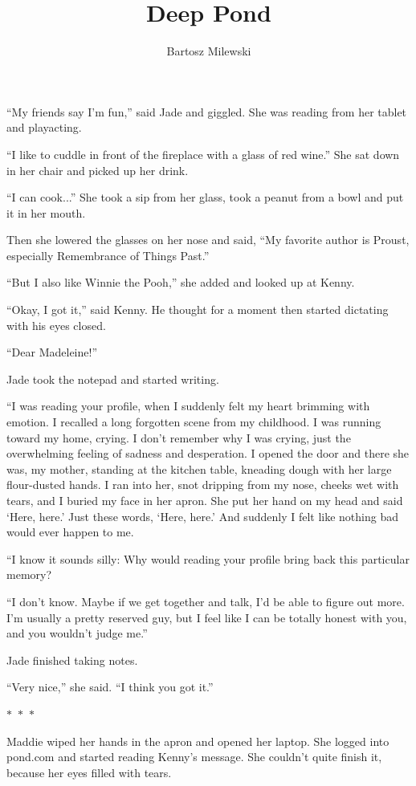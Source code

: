 \documentclass{memoir}
\author{Bartosz Milewski}
\title{Deep Pond}
\date{}
\newcommand{\starbreak}{%
\begin{center}
  $\ast$~$\ast$~$\ast$
\end{center}
}
\begin{document}
\maketitle{}


``My friends say I'm fun,'' said Jade and giggled. She was reading from her tablet and playacting.

``I like to cuddle in front of the fireplace with a glass of red wine.'' She sat down in her chair and picked up her drink. 

``I can cook...'' She took a sip from her glass, took a peanut from a bowl and put it in her mouth. 

Then she lowered the glasses on her nose and said, ``My favorite author is Proust, especially Remembrance of Things Past.''

``But I also like Winnie the Pooh,'' she added and looked up at Kenny. 

``Okay, I got it,'' said Kenny. He thought for a moment then started dictating with his eyes closed.

``Dear Madeleine!'' 

Jade took the notepad and started writing. 

``I was reading your profile, when I suddenly felt my heart brimming with emotion. I recalled a long forgotten scene from my childhood. I was running toward my home, crying. I don't remember why I was crying, just the overwhelming feeling of sadness and desperation. I opened the door and there she was, my mother, standing at the kitchen table, kneading dough with her large flour-dusted hands. I ran into her, snot dripping from my nose, cheeks wet with tears, and I buried my face in her apron. She put her hand on my head and said `Here, here.' Just these words, `Here, here.' And suddenly I felt like nothing bad would ever happen to me.

``I know it sounds silly: Why would reading your profile bring back this particular memory? 

``I don't know. Maybe if we get together and talk, I'd be able to figure out more. I'm usually a pretty reserved guy, but I feel like I can be totally honest with you, and you wouldn't judge me.''

Jade finished taking notes.

``Very nice,'' she said. ``I think you got it.''

\starbreak

Maddie wiped her hands in the apron and opened her laptop. She logged into pond.com and started reading Kenny's message. She couldn't quite finish it, because her eyes filled with tears. 
\end{document}
